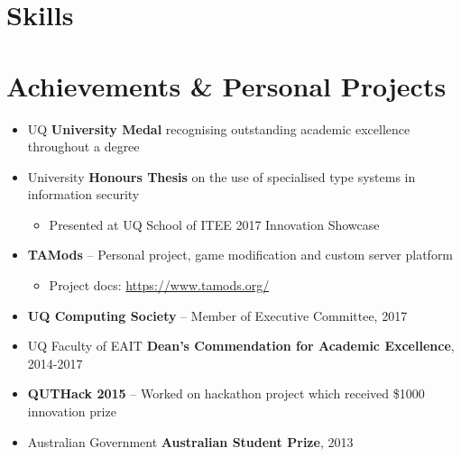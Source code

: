 \documentclass[11pt,a4paper,sans]{moderncv}        %
\begin{document}
\section{Skills}


\section{Achievements \& Personal Projects}
\begin{minipage}{\maincolumnwidth}\small
	\begin{itemize}
		\item UQ \textbf{University Medal} recognising outstanding academic excellence throughout a degree
		\item University \textbf{Honours Thesis} on the use of specialised type systems in information security
		\begin{itemize}
			\item Presented at UQ School of ITEE 2017 Innovation Showcase
		\end{itemize}
		\item \textbf{TAMods} -- Personal project, game modification and custom server platform
		\begin{itemize}
			\item Project docs: \href{https://www.tamods.org/}{https://www.tamods.org/}
		\end{itemize}
		\item \textbf{UQ Computing Society} -- Member of Executive Committee, 2017
		\item UQ Faculty of EAIT \textbf{Dean's Commendation for Academic Excellence}, 2014-2017
		\item \textbf{QUTHack 2015} -- Worked on hackathon project which received \$1000 innovation prize
		\item Australian Government \textbf{Australian Student Prize}, 2013
	\end{itemize}
\end{minipage}

\end{document}
